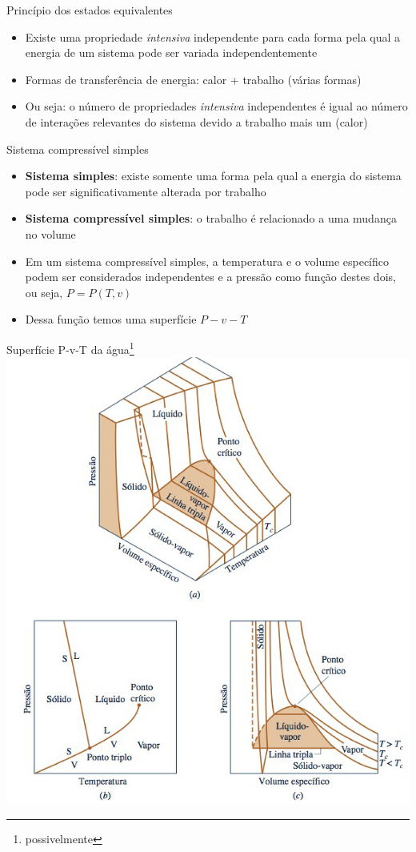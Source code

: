 \begin{frame}{Princípio dos estados equivalentes}
\begin{itemize}
    \item Existe uma propriedade \textit{intensiva} independente para cada forma pela qual a energia de um sistema pode ser variada independentemente 
    \item Formas de transferência de energia: calor + trabalho (várias formas)
    \item Ou seja: o número de propriedades \textit{intensiva} independentes é igual  ao número de interações relevantes do sistema devido a trabalho mais um (calor)
\end{itemize}
\begin{block}
    {Sistema compressível simples}
    \begin{itemize}
        \item \textbf{Sistema simples}: existe somente uma forma pela qual a energia do sistema pode ser significativamente alterada por trabalho
        \item \textbf{Sistema compressível simples}: o trabalho é relacionado a uma mudança no volume
        \item Em um sistema compressível simples, a temperatura e o volume específico podem ser considerados independentes e a pressão como função destes dois, ou seja, 
        \(
        P= P(T,v)
        \)
        \item Dessa função temos uma superfície \(P-v-T\)
    \end{itemize}
\end{block}
\end{frame}

\begin{frame}{Superfície P-v-T da água\footnote{possivelmente}}
\centering
\includegraphics[height=7.5cm-5pt]{images/pvt.png}
\end{frame}

